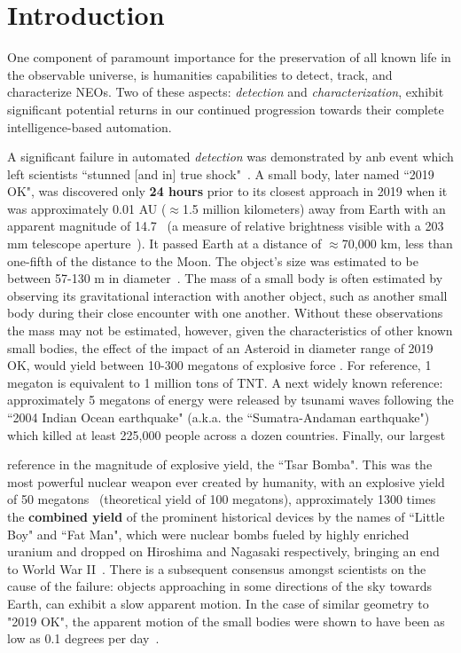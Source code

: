 \chapter{Introduction}

One component of paramount importance for the preservation of all known life in
the observable universe, is humanities capabilities to detect, track, and
characterize \glspl{NEO}. Two of these aspects: \textit{detection} and
\textit{characterization}, exhibit significant potential returns in our
continued progression towards their complete intelligence-based automation.

A significant failure in automated \textit{detection} was demonstrated by anb
event which left scientists {``stunned [and in] true shock"}~\cite{chiu_2019}. A
small body, later named ``2019 OK",  was discovered only \textbf{24 hours} prior
to its closest approach in 2019 when it was approximately 0.01 AU ($\approx$1.5
million kilometers) away from Earth with an apparent magnitude of
14.7~\cite{IAU2019OK} (a measure of relative brightness visible with a 203 mm
telescope aperture~\cite[p.~24]{North2014}). It passed Earth at a distance of
$\approx$70,000 km, less than one-fifth of the distance to the Moon. The %
 object's size was estimated to be between 57-130 m in
diameter~\cite{NASA2019}. The mass of a small body is often estimated by
observing its gravitational interaction with another object, such as another
small body during their close encounter with one another. Without these
observations the mass may not be estimated, however, given the characteristics
of other known small bodies, the effect of the impact of an Asteroid in diameter
range of 2019 OK, would yield between 10-300 megatons of explosive force
\cite{Cellino1999, Rumpf2017}. For reference, 1 megaton is equivalent to 1
million tons of TNT. A next widely known reference: approximately 5 megatons of
energy were released by tsunami waves following the ``2004 Indian Ocean
earthquake" (a.k.a. the ``Sumatra-Andaman earthquake") \cite{Nirupama2006} which
killed at least 225,000 people across a dozen countries. Finally, our largest


reference in the magnitude of explosive yield, the ``Tsar Bomba". This was the
most powerful nuclear weapon ever created by humanity, with an explosive yield
of 50 megatons~\cite{Khan2020} (theoretical yield of 100 megatons),
approximately 1300 times the \textbf{combined yield} of the prominent historical
devices by the names of ``Little Boy" and ``Fat Man", which were nuclear bombs
fueled by highly enriched uranium and dropped on Hiroshima and Nagasaki
respectively, bringing an end to World War II~\cite{osti_1489669}.
There is a subsequent consensus amongst scientists on the cause of the failure:
objects approaching in some directions of the sky towards Earth, can exhibit a
slow apparent motion. In the case of similar geometry to "2019 OK", the apparent
motion of the small bodies were shown to have been as low as 0.1 degrees per
day~\cite{Wainscoat2022}.

